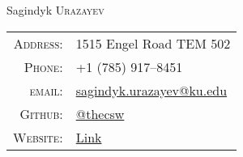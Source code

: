 \documentclass[a4paper,10pt]{article}
\begin{document}
\pagestyle{empty} %

\par{\centering
		{\Huge Sagindyk \textsc{Urazayev}
	}\bigskip\par}

      \begin{center}
        \begin{tabular}{rl}
          \textsc{Address:}   & 1515 Engel Road TEM 502 \\
          \textsc{Phone:}     & +1 (785) 917--8451\\
          \textsc{email:}     & \href{mailto:sagindyk.urazayev@ku.edu}{sagindyk.urazayev@ku.edu}\\
          \textsc{Github:} & \href{https://github.com/thecsw}{@thecsw}\\
          \textsc{Website:} & \href{http://people.ku.edu/~s383u895}{Link}\\
        \end{tabular}
      \end{center}

\end{document}
